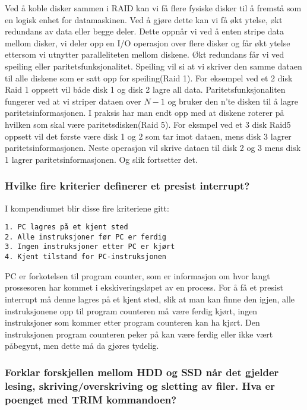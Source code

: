 \documentclass[9pt]{article}
\begin{document}
Ved å koble disker sammen i RAID kan vi få flere fysiske disker til å fremstå som en logisk enhet for datamaskinen. Ved å gjøre dette kan vi få økt ytelse, økt redundans av data eller begge deler. Dette oppnår vi ved å enten stripe data mellom disker, vi deler opp en I/O operasjon over flere disker og får økt ytelse ettersom vi utnytter paralleliteten mellom diskene. Økt redundans får vi ved speiling eller paritetsfunksjonalitet. Speiling vil si at vi skriver den samme dataen til alle diskene som er satt opp for speiling(Raid 1). For eksempel ved et 2 disk Raid 1 oppsett vil både disk 1 og disk 2 lagre all data. Paritetsfunksjonaliten fungerer ved at vi striper dataen over $N - 1$ og bruker den n'te disken til å lagre paritetsinformasjonen. I praksis har man endt opp med at diskene roterer på hvilken som skal være paritetsdisken(Raid 5). For eksmpel ved et 3 disk Raid5 oppsett vil det første være disk 1 og 2 som tar imot dataen, mens disk 3 lagrer paritetsinformasjonen. Neste operasjon vil skrive dataen til disk 2 og 3 mens disk 1 lagrer paritetsinformasjonen. Og slik fortsetter det.  

\subsubsection{Hvilke fire kriterier definerer et presist interrupt?}

I kompendiumet blir disse fire kriteriene gitt: \\ 
\begin{verbatim}
1. PC lagres på et kjent sted
2. Alle instruksjoner før PC er ferdig 
3. Ingen instruksjoner etter PC er kjørt 
4. Kjent tilstand for PC-instruksjonen
\end{verbatim}

PC er forkotelsen til program counter, som er informasjon om hvor langt prossesoren har kommet i ekskiveringsløpet av en process. For å få et presist interrupt må denne lagres på et kjent sted, slik at man kan finne den igjen, alle instruksjonene opp til program counteren må være ferdig kjørt, ingen instruksjoner som kommer etter program counteren kan ha kjørt. Den instruksjonen program counteren peker på kan være ferdig eller ikke vært påbegynt, men dette må da gjøres tydelig. 

\subsubsection{Forklar forskjellen mellom HDD og SSD når det gjelder lesing, skriving/overskriving og sletting av filer. Hva er poenget med TRIM kommandoen?}
\end{document}
